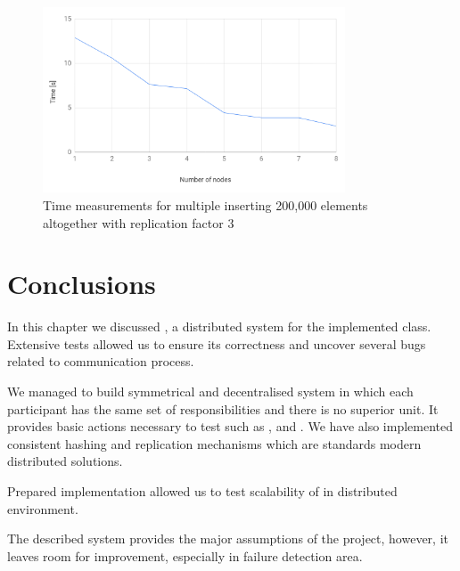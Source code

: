     \begin{figure}[ht]
        \centering
        \includegraphics[width=0.8\textwidth]{thesis/figures/rf3MultipleInserts.png}
        \caption{Time measurements for multiple \Nodes inserting 200,000 elements altogether with replication factor 3}
        \label{mrf3}
    \end{figure}
    

\section{Conclusions}
    In this chapter we discussed  \DHTS, a distributed system for the implemented \PHT class.
    Extensive tests allowed us to ensure its correctness and uncover several bugs related to communication process.
    
    
    We managed to build symmetrical and decentralised system in which each participant has the same set of responsibilities and there is no superior unit.
    It provides basic actions necessary to test \PHT such as \insertMethod, \getMethod and \removeMethod.
    We have also implemented consistent hashing and replication mechanisms which are standards modern distributed solutions.
    
    
    Prepared \DHTS implementation allowed us to test scalability of \PHT in distributed environment.
    
    
    The described system provides the major assumptions of the project, however, it leaves room for improvement, especially in failure detection area.